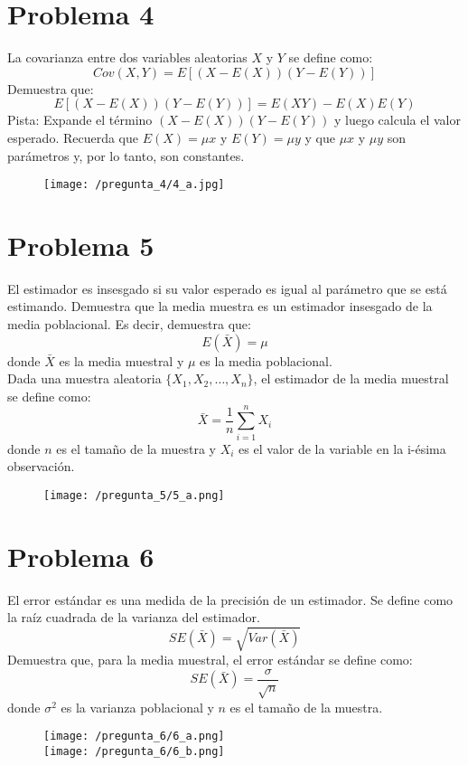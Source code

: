 \documentclass[a4paper]{article}
\begin{document}
\section*{Problema 4}

La covarianza entre dos variables aleatorias $X$ y $Y$ se define como:
$$Cov(X,Y)=E[(X-E(X))(Y-E(Y))]$$
Demuestra que: 
$$E[(X-E(X))(Y-E(Y))]=E(XY)-E(X)E(Y)$$
Pista: Expande el término $(X-E(X))(Y-E(Y))$ y luego calcula el valor esperado. Recuerda que $E(X)=\mu x$ y $E(Y)=\mu y$ y que $\mu x$ y $\mu y$ son parámetros y, por lo tanto, son constantes.

\begin{figure}[H]
	\centering
	\texttt{[image: /pregunta\_4/4\_a.jpg]}
\end{figure}

\section*{Problema 5}

El estimador es insesgado si su valor esperado es igual al parámetro que se está estimando. Demuestra que la media muestra es un estimador insesgado de la media poblacional. Es decir, demuestra que: 
$$E(\bar{X})=\mu$$
donde $\bar{X}$ es la media muestral y $\mu$ es la media poblacional.
\\
Dada una muestra aleatoria $\{X_1, X_2, \ldots, X_n\}$, el estimador de la media muestral se define como: 
$$
\bar{X}	=	\frac{1}{n}	\sum_{i=1}^{n}	X_i
$$
donde $n$ es el tamaño de la muestra y $X_i$ es el valor de la variable en la i-ésima observación.

	\begin{figure}[H]
	\texttt{[image: /pregunta\_5/5\_a.png]}
	\end{figure}

\section*{Problema 6}

El error estándar es una medida de la precisión de un estimador. Se define como la raíz cuadrada de la varianza del estimador. 
$$
SE(\bar{X})=\sqrt{Var(\bar{X})}
$$
Demuestra que, para la media muestral, el error estándar se define como: 
$$
SE(\bar{X})=\frac{\sigma}{\sqrt{n}}
$$
donde $\sigma^2$ es la varianza poblacional y $n$ es el tamaño de la muestra.

	\begin{figure}[H]
	\texttt{[image: /pregunta\_6/6\_a.png]}
	\\
	\texttt{[image: /pregunta\_6/6\_b.png]}
	\end{figure}
\end{document}
